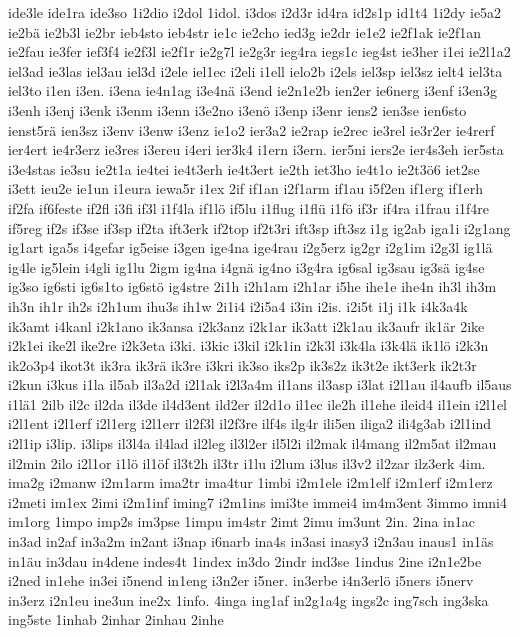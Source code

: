 {ide3le
ide1ra
ide3so
1i2dio
i2dol
1idol.
i3dos
i2d3r
id4ra
id2s1p
id1t4
1i2dy
ie5a2
ie2bä
ie2b3l
ie2br
ieb4sto
ieb4str
ie1c
ie2cho
ied3g
ie2dr
ie1e2
ie2f1ak
ie2f1an
ie2fau
ie3fer
ief3f4
ie2f3l
ie2f1r
ie2g7l
ie2g3r
ieg4ra
iegs1c
ieg4st
ie3her
i1ei
ie2l1a2
iel3ad
ie3las
iel3au
iel3d
i2ele
iel1ec
i2eli
i1ell
ielo2b
i2els
iel3sp
iel3sz
ielt4
iel3ta
iel3to
i1en
i3en.
i3ena
ie4n1ag
i3e4nä
i3end
ie2n1e2b
ien2er
ie6nerg
i3enf
i3en3g
i3enh
i3enj
i3enk
i3enm
i3enn
i3e2no
i3enö
i3enp
i3enr
iens2
ien3se
ien6sto
ienst5rä
ien3sz
i3env
i3enw
i3enz
ie1o2
ier3a2
ie2rap
ie2rec
ie3rel
ie3r2er
ie4rerf
ier4ert
ie4r3erz
ie3res
i3ereu
i4eri
ier3k4
i1ern
i3ern.
ier5ni
iers2e
ier4s3eh
ier5sta
i3e4stas
ie3su
ie2t1a
ie4tei
ie4t3erh
ie4t3ert
ie2th
iet3ho
ie4t1o
ie2t3ö6
iet2se
i3ett
ieu2e
ie1un
i1eura
iewa5r
i1ex
2if
if1an
i2f1arm
if1au
i5f2en
if1erg
if1erh
if2fa
if6feste
if2fl
i3fi
if3l
i1f4la
if1lö
if5lu
i1flug
i1flü
i1fö
if3r
if4ra
i1frau
i1f4re
if5reg
if2s
if3se
if3sp
if2ta
ift3erk
if2top
if2t3ri
ift3sp
ift3sz
i1g
ig2ab
iga1i
i2g1ang
ig1art
iga5s
i4gefar
ig5eise
i3gen
ige4na
ige4rau
i2g5erz
ig2gr
i2g1im
i2g3l
ig1lä
ig4le
ig5lein
i4gli
ig1lu
2igm
ig4na
i4gnä
ig4no
i3g4ra
ig6sal
ig3sau
ig3sä
ig4se
ig3so
ig6sti
ig6s1to
ig6stö
ig4stre
2i1h
i2h1am
i2h1ar
i5he
ihe1e
ihe4n
ih3l
ih3m
ih3n
ih1r
ih2s
i2h1um
ihu3s
ih1w
2i1i4
i2i5a4
i3in
i2is.
i2i5t
i1j
i1k
i4k3a4k
ik3amt
i4kanl
i2k1ano
ik3ansa
i2k3anz
i2k1ar
ik3att
i2k1au
ik3aufr
ik1är
2ike
i2k1ei
ike2l
ike2re
i2k3eta
i3ki.
i3kic
i3kil
i2k1in
i2k3l
i3k4la
i3k4lä
ik1lö
i2k3n
ik2o3p4
ikot3t
ik3ra
ik3rä
ik3re
i3kri
ik3so
iks2p
ik3s2z
ik3t2e
ikt3erk
ik2t3r
i2kun
i3kus
i1la
il5ab
il3a2d
i2l1ak
i2l3a4m
il1ans
il3asp
i3lat
i2l1au
il4aufb
il5aus
i1lä1
2ilb
il2c
il2da
il3de
il4d3ent
ild2er
il2d1o
il1ec
ile2h
il1ehe
ileid4
il1ein
i2l1el
i2l1ent
i2l1erf
i2l1erg
i2l1err
il2f3l
il2f3re
ilf4s
ilg4r
ili5en
iliga2
ili4g3ab
i2l1ind
i2l1ip
i3lip.
i3lips
il3l4a
il4lad
il2leg
il3l2er
il5l2i
il2mak
il4mang
il2m5at
il2mau
il2min
2ilo
i2l1or
i1lö
il1öf
il3t2h
il3tr
i1lu
i2lum
i3lus
il3v2
il2zar
ilz3erk
4im.
ima2g
i2manw
i2m1arm
ima2tr
ima4tur
1imbi
i2m1ele
i2m1elf
i2m1erf
i2m1erz
i2meti
im1ex
2imi
i2m1inf
iming7
i2m1ins
imi3te
immei4
im4m3ent
3immo
imni4
im1org
1impo
imp2s
im3pse
1impu
im4str
2imt
2imu
im3unt
2in.
2ina
in1ac
in3ad
in2af
in3a2m
in2ant
i3nap
i6narb
ina4s
in3asi
inasy3
i2n3au
inaus1
in1äs
in1äu
in3dau
in4dene
indes4t
1index
in3do
2indr
ind3se
1indus
2ine
i2n1e2be
i2ned
in1ehe
in3ei
i5nend
in1eng
i3n2er
i5ner.
in3erbe
i4n3erlö
i5ners
i5nerv
in3erz
i2n1eu
ine3un
ine2x
1info.
4inga
ing1af
in2g1a4g
ings2c
ing7sch
ing3ska
ing5ste
1inhab
2inhar
2inhau
2inhe
}
